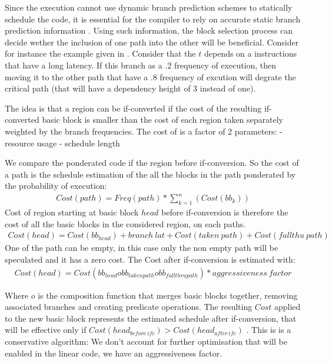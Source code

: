 Since the execution cannot use dynamic branch prediction schemes to statically schedule the code, it is essential for the compiler to rely on accurate static branch prediction information \cite{Fisher:1992:PCB:143371.143493}. Using such information, the block selection process can decide wether the inclusion of one path into the other will be beneficial. Consider for instance the example given in \label{fig:ssa1}. Consider that the $t$ depends on a instructions that have a long latency. If this branch as a .2 frequency of execution, then moving it to the other path that have a .8 frequency of excution will degrate the critical path (that will have a dependency height of 3 instead of one).

The idea is that a region can be if-converted if the cost of the resulting if-converted basic block is smaller than the cost of each region taken separately weighted by the branch frequencies. The cost of is a factor of 2 parameters:
- resource usage
- schedule length

We compare the ponderated code if the region before if-conversion. So the cost of a path is the schedule estimation of the all the blocks in the path ponderated by the probability of execution:
\begin{align}
Cost(path)=Freq(path)*\sum_{k=1}^n(Cost(bb_{k}))
\end{align}
Cost of region starting at basic block $head$ before if-conversion is therefore the cost of all the basic blocks in the considered region, on each paths.
\begin{align}
Cost(head)=Cost(bb_{head})+branch\:lat+Cost(taken\:path)+Cost(fallthu\:path)
\end{align}
One of the path can be empty, in this case only the non empty path will be speculated and it has a zero cost. The Cost after if-conversion is estimated with:
\begin{align}
Cost(head)=Cost(bb_{head} o bb_{taken path} o bb_{fallthru path}) * aggressiveness\:factor
\end{align}

Where $o$ is the composition function that merges basic blocks together, removing associated branches and creating predicate operations. The resulting $Cost$ applied to the new basic block represents the estimated schedule after if-conversion, that will be effective only if $Cost(head_{before\,ifc}) > Cost(head_{after\,ifc})$ . This is is a conservative algorithm: We don't account for further optimisation that will be enabled in the linear code, we have an aggressiveness factor. 
 
